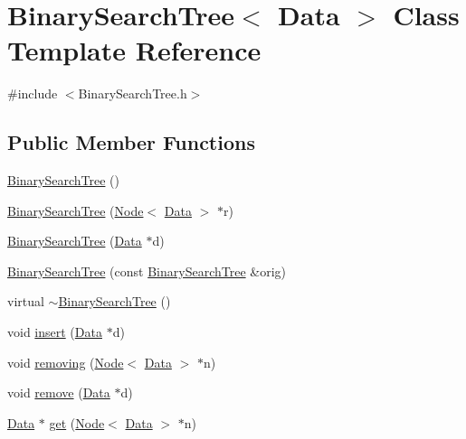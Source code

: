 \hypertarget{classBinarySearchTree}{}\section{Binary\+Search\+Tree$<$ Data $>$ Class Template Reference}
\label{classBinarySearchTree}


{\ttfamily \#include $<$Binary\+Search\+Tree.\+h$>$}

\subsection*{Public Member Functions}
\begin{DoxyCompactItemize}
\item 
\hyperlink{classBinarySearchTree_a7b35ab9f4412896260a28fe334276799}{Binary\+Search\+Tree} ()
\item 
\hyperlink{classBinarySearchTree_a18ff8e101f7f46ecfa513389e0ee1e6e}{Binary\+Search\+Tree} (\hyperlink{classNode}{Node}$<$ \hyperlink{main_8cpp_a0c209e815d35b218025a240523b4335b}{Data} $>$ $\ast$r)
\item 
\hyperlink{classBinarySearchTree_ae3cc4b261ab41d29a1d098a9987ed43e}{Binary\+Search\+Tree} (\hyperlink{main_8cpp_a0c209e815d35b218025a240523b4335b}{Data} $\ast$d)
\item 
\hyperlink{classBinarySearchTree_a950670fa849792208b16e2364606a3c9}{Binary\+Search\+Tree} (const \hyperlink{classBinarySearchTree}{Binary\+Search\+Tree} \&orig)
\item 
virtual \hyperlink{classBinarySearchTree_af4bc47e513878850e0d74957297b9571}{$\sim$\+Binary\+Search\+Tree} ()
\item 
void \hyperlink{classBinarySearchTree_a2336ba86e7d9803c3979b199fea2ae43}{insert} (\hyperlink{main_8cpp_a0c209e815d35b218025a240523b4335b}{Data} $\ast$d)
\item 
void \hyperlink{classBinarySearchTree_aa853db6eed3b39b2db829c715413526b}{removing} (\hyperlink{classNode}{Node}$<$ \hyperlink{main_8cpp_a0c209e815d35b218025a240523b4335b}{Data} $>$ $\ast$n)
\item 
void \hyperlink{classBinarySearchTree_a89e97ae842dae9bf54d5dd27c59ee04c}{remove} (\hyperlink{main_8cpp_a0c209e815d35b218025a240523b4335b}{Data} $\ast$d)
\item 
\hyperlink{main_8cpp_a0c209e815d35b218025a240523b4335b}{Data} $\ast$ \hyperlink{classBinarySearchTree_a4374a8c6a86507203322aa336651582d}{get} (\hyperlink{classNode}{Node}$<$ \hyperlink{main_8cpp_a0c209e815d35b218025a240523b4335b}{Data} $>$ $\ast$n)

\end{DoxyCompactItemize}
